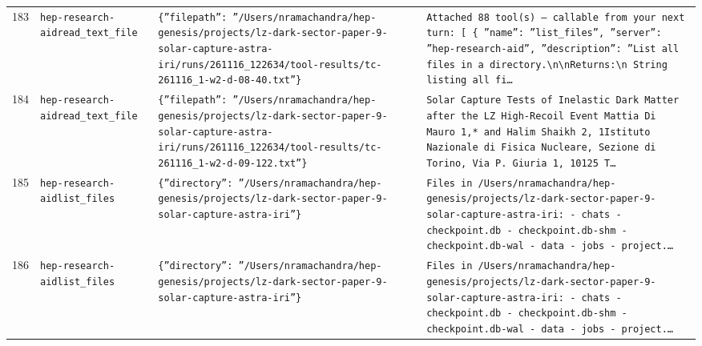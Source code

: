 \documentclass[11pt,a4paper]{article}
\begin{document}
\begin{longtable}{@{}p{}p{}p{}p{}@{}}
183 & \texttt{hep-research-aid}\newline\texttt{read\_\allowbreak{}text\_\allowbreak{}file} & \texttt{\{''filepath'':\allowbreak{} ''/\allowbreak{}Users/\allowbreak{}nramachandra/\allowbreak{}hep-genesis/\allowbreak{}projects/\allowbreak{}lz-dark-sector-paper-9-solar-capture-astra-iri/\allowbreak{}runs/\allowbreak{}261116\_\allowbreak{}122634/\allowbreak{}tool-results/\allowbreak{}tc-261116\_\allowbreak{}1-w2-d-08-40.txt''\}\allowbreak{}} & \texttt{Attached 88 tool(s)\allowbreak{} --- callable from your next turn:\allowbreak{} [  \{   ''name'':\allowbreak{} ''list\_\allowbreak{}files'',\allowbreak{}   ''server'':\allowbreak{} ''hep-research-aid'',\allowbreak{}   ''description'':\allowbreak{} ''List all files in a directory.\textbackslash{}\allowbreak{}n\textbackslash{}\allowbreak{}nReturns:\allowbreak{}\textbackslash{}\allowbreak{}n    String listing all fi\ldots{}\allowbreak{}} \\
184 & \texttt{hep-research-aid}\newline\texttt{read\_\allowbreak{}text\_\allowbreak{}file} & \texttt{\{''filepath'':\allowbreak{} ''/\allowbreak{}Users/\allowbreak{}nramachandra/\allowbreak{}hep-genesis/\allowbreak{}projects/\allowbreak{}lz-dark-sector-paper-9-solar-capture-astra-iri/\allowbreak{}runs/\allowbreak{}261116\_\allowbreak{}122634/\allowbreak{}tool-results/\allowbreak{}tc-261116\_\allowbreak{}1-w2-d-09-122.txt''\}\allowbreak{}} & \texttt{Solar Capture Tests of Inelastic Dark Matter after the LZ High-Recoil Event Mattia Di Mauro 1,\allowbreak{}* and Halim Shaikh 2,\allowbreak{}\dag{}\allowbreak{} 1Istituto Nazionale di Fisica Nucleare,\allowbreak{} Sezione di Torino,\allowbreak{} Via P. Giuria 1,\allowbreak{} 10125 T\ldots{}\allowbreak{}} \\
185 & \texttt{hep-research-aid}\newline\texttt{list\_\allowbreak{}files} & \texttt{\{''directory'':\allowbreak{} ''/\allowbreak{}Users/\allowbreak{}nramachandra/\allowbreak{}hep-genesis/\allowbreak{}projects/\allowbreak{}lz-dark-sector-paper-9-solar-capture-astra-iri''\}\allowbreak{}} & \texttt{Files in /\allowbreak{}Users/\allowbreak{}nramachandra/\allowbreak{}hep-genesis/\allowbreak{}projects/\allowbreak{}lz-dark-sector-paper-9-solar-capture-astra-iri:\allowbreak{}   - chats   - checkpoint.db   - checkpoint.db-shm   - checkpoint.db-wal   - data   - jobs   - project.\ldots{}\allowbreak{}} \\
186 & \texttt{hep-research-aid}\newline\texttt{list\_\allowbreak{}files} & \texttt{\{''directory'':\allowbreak{} ''/\allowbreak{}Users/\allowbreak{}nramachandra/\allowbreak{}hep-genesis/\allowbreak{}projects/\allowbreak{}lz-dark-sector-paper-9-solar-capture-astra-iri''\}\allowbreak{}} & \texttt{Files in /\allowbreak{}Users/\allowbreak{}nramachandra/\allowbreak{}hep-genesis/\allowbreak{}projects/\allowbreak{}lz-dark-sector-paper-9-solar-capture-astra-iri:\allowbreak{}   - chats   - checkpoint.db   - checkpoint.db-shm   - checkpoint.db-wal   - data   - jobs   - project.\ldots{}\allowbreak{}} \\

\end{longtable}
\end{document}
